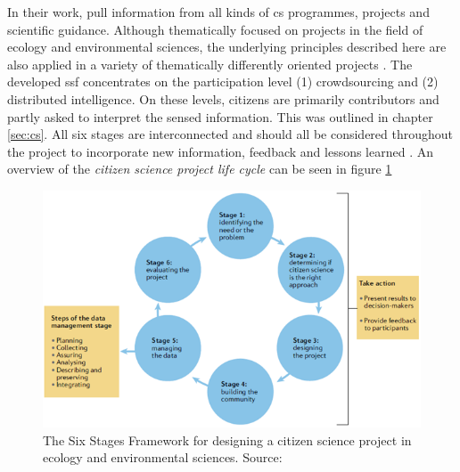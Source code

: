 In their work, \textcite{fraislCitizenScienceEnvironmental2022} pull information from all kinds of \acrshort{cs} programmes, projects and scientific guidance. Although thematically focused on projects in the field of ecology and environmental sciences, the underlying principles described here are also applied in a variety of thematically differently oriented projects \autocite{fraislCitizenScienceEnvironmental2022}. The developed \acrfull{ssf} concentrates on the participation level (1) crowdsourcing and (2) distributed intelligence. On these levels, citizens are primarily contributors and partly asked to interpret the sensed information. This was outlined in chapter \ref{sec:cs}. All six stages are interconnected and should all be considered throughout the project to incorporate new information, feedback and lessons learned \autocite{fraislCitizenScienceEnvironmental2022}. An overview of the \textit{citizen science project life cycle} can be seen in figure \ref{fig:meth_ssf}

\begin{figure}[!htp]
    \centering
    \includegraphics[width=1.0\textwidth]{figures/2023_MA_methods_ssf_original.png}
    \decoRule
    \caption[The Six Stages Framework]{The Six Stages Framework for designing a citizen science project in ecology and environmental sciences. Source: \autocite[4]{fraislCitizenScienceEnvironmental2022}}%
    \label{fig:meth_ssf}
\end{figure}

